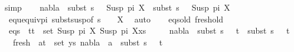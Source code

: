\begin{isabellebody}
\ simp\isanewline
\ \ \isamarkupfalse%
\ {\isachardoublequoteopen}nabla{}\ {\isasymturnstile}\ subst\ {\isacharparenleft}{\kern0pt}s{}\ {\isasymbullet}\ {\isacharbrackleft}{\kern0pt}{\isacharbrackright}{\kern0pt}{\isacharparenright}{\kern0pt}\ {\isacharparenleft}{\kern0pt}Susp\ pi{}\ X{\isacharparenright}{\kern0pt}\ {\isasymapprox}\ subst\ {\isacharparenleft}{\kern0pt}s{}\ {\isasymbullet}\ {\isacharbrackleft}{\kern0pt}{\isacharbrackright}{\kern0pt}{\isacharparenright}{\kern0pt}\ {\isacharparenleft}{\kern0pt}Susp\ pi{}\ X{\isacharparenright}{\kern0pt}{\isachardoublequoteclose}\isanewline
\ \ \ \ \isamarkupfalse%
\ \ equ{\isacharunderscore}{\kern0pt}equiv{\isacharunderscore}{\kern0pt}pi\ subst{\isacharunderscore}{\kern0pt}susp{\isacharbrackleft}{\kern0pt}of\ {\isacartoucheopen}{\isacharparenleft}{\kern0pt}s{}\ {\isasymbullet}\ {\isacharbrackleft}{\kern0pt}{\isacharbrackright}{\kern0pt}{\isacharparenright}{\kern0pt}{\isacartoucheclose}\ {\isacharunderscore}{\kern0pt}\ X{\isacharbrackright}{\kern0pt}\ \isamarkupfalse%
\ auto\isanewline
\ \ \isamarkupfalse%
\ eqs{\isacharunderscore}{\kern0pt}old\ fresh{\isacharunderscore}{\kern0pt}old\ \isamarkupfalse%
\isanewline
\ \ eqs{\isacharcolon}{\kern0pt}\ {\isachardoublequoteopen}{\isasymforall}\ {\isacharparenleft}{\kern0pt}t{}{\isacharcomma}{\kern0pt}t{}{\isacharparenright}{\kern0pt}\ {\isasymin}\ set\ {\isacharparenleft}{\kern0pt}{\isacharparenleft}{\kern0pt}Susp\ pi{}\ X{\isacharcomma}{\kern0pt}\ Susp\ pi{}\ X{\isacharparenright}{\kern0pt}{\isacharhash}{\kern0pt}xs{\isacharparenright}{\kern0pt}{\isachardot}{\kern0pt}\ \isanewline
\ \ \ \ nabla{}\ {\isasymturnstile}\ subst\ {\isacharparenleft}{\kern0pt}s{}\ {\isasymbullet}\ {\isacharbrackleft}{\kern0pt}{\isacharbrackright}{\kern0pt}{\isacharparenright}{\kern0pt}\ t{}\ {\isasymapprox}\ subst\ {\isacharparenleft}{\kern0pt}s{}\ {\isasymbullet}\ {\isacharbrackleft}{\kern0pt}{\isacharbrackright}{\kern0pt}{\isacharparenright}{\kern0pt}\ t{}{\isachardoublequoteclose}\isanewline
\ \ \ fresh{\isacharcolon}{\kern0pt}\ {\isachardoublequoteopen}{\isasymforall}\ {\isacharparenleft}{\kern0pt}a{\isacharcomma}{\kern0pt}t{\isacharparenright}{\kern0pt}\ {\isasymin}\ set\ ys{\isachardot}{\kern0pt}\ nabla{}\ {\isasymturnstile}\ a\ {\isasymsharp}\ subst\ {\isacharparenleft}{\kern0pt}s{}\ {\isasymbullet}\ {\isacharbrackleft}{\kern0pt}{\isacharbrackright}{\kern0pt}{\isacharparenright}{\kern0pt}\ t{\isachardoublequoteclose}\isanewline

\end{isabellebody}

